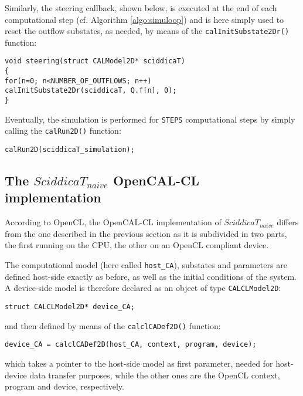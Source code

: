\noindent Similarly, the steering callback, shown below, is executed at the
end of each computational step (cf. Algorithm \ref{algo:simuloop})
and is here simply used to reset the outflow substates, as needed,
by means of the \verb'calInitSubstate2Dr()' function:

\begin{lstlisting}[basicstyle=\footnotesize, numbers=none]
void steering(struct CALModel2D* sciddicaT)
{
for(n=0; n<NUMBER_OF_OUTFLOWS; n++)
calInitSubstate2Dr(sciddicaT, Q.f[n], 0);
}
\end{lstlisting}

\noindent Eventually, the simulation is performed for \verb'STEPS'
computational steps by simply calling the \verb'calRun2D()'
function:

\begin{lstlisting}[basicstyle=\footnotesize, numbers=none]
calRun2D(sciddicaT_simulation);
\end{lstlisting}


\subsection{The $SciddicaT_{naive}$ OpenCAL-CL implementation}
\label{sec:sciddica_cl}
According to OpenCL, the OpenCAL-CL implementation of
$SciddicaT_{naive}$ differs from the one described in the previous
section as it is subdivided in two parts, the first running on the
CPU, the other on an OpenCL compliant device.

The computational model (here called \verb'host_CA'), substates and
parameters are defined host-side exactly as before, as well as the
initial conditions of the system. A device-side model is therefore
declared as an object of type \verb'CALCLModel2D':

\begin{lstlisting}[basicstyle=\footnotesize, numbers=none]
struct CALCLModel2D* device_CA;
\end{lstlisting}

\noindent and then defined by means of the \verb'calclCADef2D()'
function:

\begin{lstlisting}[basicstyle=\footnotesize, numbers=none]
device_CA = calclCADef2D(host_CA, context, program, device);
\end{lstlisting}

\noindent which takes a pointer to the host-side model as first
parameter, needed for host-device data transfer purposes, while the
other ones are the OpenCL context, program and device, respectively.

